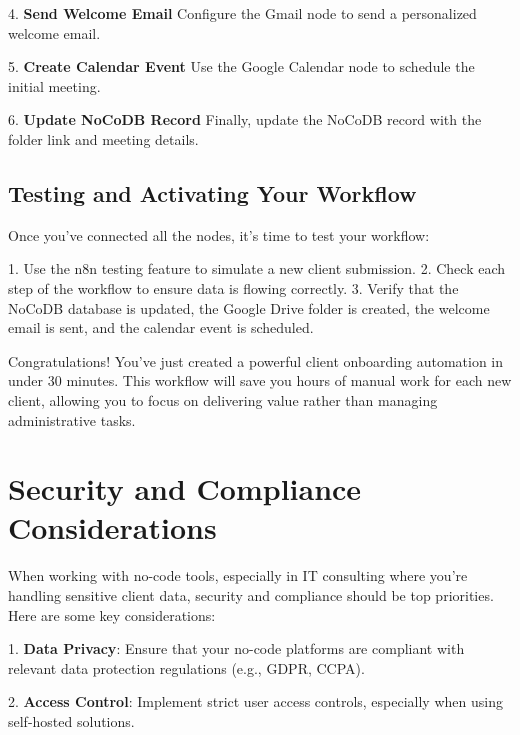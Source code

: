 4. \textbf{Send Welcome Email}
Configure the Gmail node to send a personalized welcome email.


5. \textbf{Create Calendar Event}
Use the Google Calendar node to schedule the initial meeting.


6. \textbf{Update NoCoDB Record}
Finally, update the NoCoDB record with the folder link and meeting details.


\subsection{Testing and Activating Your Workflow}

Once you've connected all the nodes, it's time to test your workflow:

1. Use the n8n testing feature to simulate a new client submission.
2. Check each step of the workflow to ensure data is flowing correctly.
3. Verify that the NoCoDB database is updated, the Google Drive folder is created, the welcome email is sent, and the calendar event is scheduled.


Congratulations! You've just created a powerful client onboarding automation in under 30 minutes. This workflow will save you hours of manual work for each new client, allowing you to focus on delivering value rather than managing administrative tasks.

\section{Security and Compliance Considerations}

When working with no-code tools, especially in IT consulting where you're handling sensitive client data, security and compliance should be top priorities. Here are some key considerations:

1. \textbf{Data Privacy}: Ensure that your no-code platforms are compliant with relevant data protection regulations (e.g., GDPR, CCPA).

2. \textbf{Access Control}: Implement strict user access controls, especially when using self-hosted solutions.

